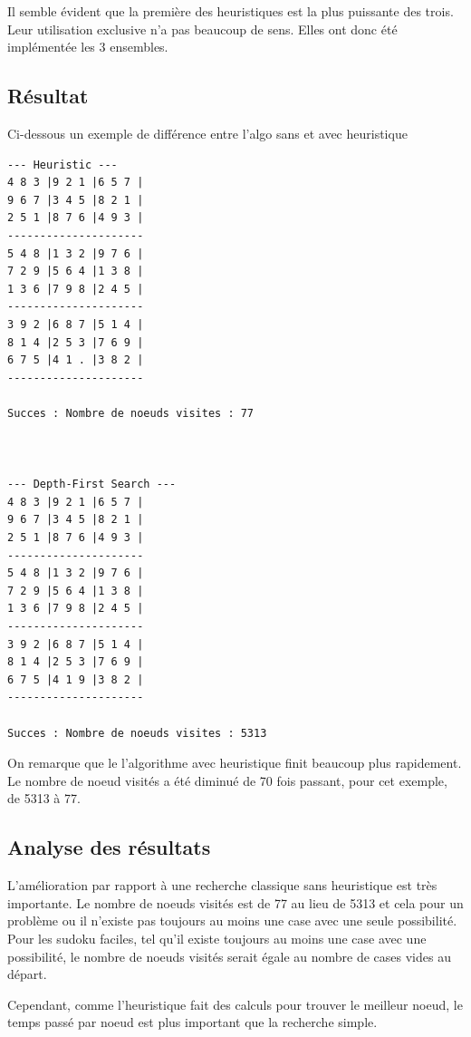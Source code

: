 \documentclass[a4paper,10pt]{article}
\begin{document}
Il semble évident que la première des heuristiques est la plus puissante des trois. Leur utilisation exclusive n'a pas beaucoup de sens. Elles ont donc été implémentée les 3 ensembles.

\subsection{Résultat}

Ci-dessous un exemple de différence entre l'algo sans et avec heuristique
\begin{verbatim}
--- Heuristic ---
4 8 3 |9 2 1 |6 5 7 |
9 6 7 |3 4 5 |8 2 1 |
2 5 1 |8 7 6 |4 9 3 |
---------------------
5 4 8 |1 3 2 |9 7 6 |
7 2 9 |5 6 4 |1 3 8 |
1 3 6 |7 9 8 |2 4 5 |
---------------------
3 9 2 |6 8 7 |5 1 4 |
8 1 4 |2 5 3 |7 6 9 |
6 7 5 |4 1 . |3 8 2 |
---------------------

Succes : Nombre de noeuds visites : 77



--- Depth-First Search ---
4 8 3 |9 2 1 |6 5 7 |
9 6 7 |3 4 5 |8 2 1 |
2 5 1 |8 7 6 |4 9 3 |
---------------------
5 4 8 |1 3 2 |9 7 6 |
7 2 9 |5 6 4 |1 3 8 |
1 3 6 |7 9 8 |2 4 5 |
---------------------
3 9 2 |6 8 7 |5 1 4 |
8 1 4 |2 5 3 |7 6 9 |
6 7 5 |4 1 9 |3 8 2 |
---------------------

Succes : Nombre de noeuds visites : 5313
\end{verbatim}
On remarque que le l'algorithme avec heuristique finit beaucoup plus rapidement. Le nombre de noeud visités a été diminué de 70 fois passant, pour cet exemple, de 5313 à 77.

\subsection{Analyse des résultats}

L'amélioration par rapport à une recherche classique sans heuristique est très importante. Le nombre de noeuds visités est de 77 au lieu de 5313 et cela pour un problème ou il n'existe pas toujours au moins une case avec une seule possibilité.\\

Pour les sudoku faciles, tel qu'il existe toujours au moins une case avec une possibilité, le nombre de noeuds visités serait égale au nombre de cases vides au départ.

Cependant, comme l'heuristique fait des calculs pour trouver le meilleur noeud, le temps passé par noeud est plus important que la recherche simple.
\end{document}
